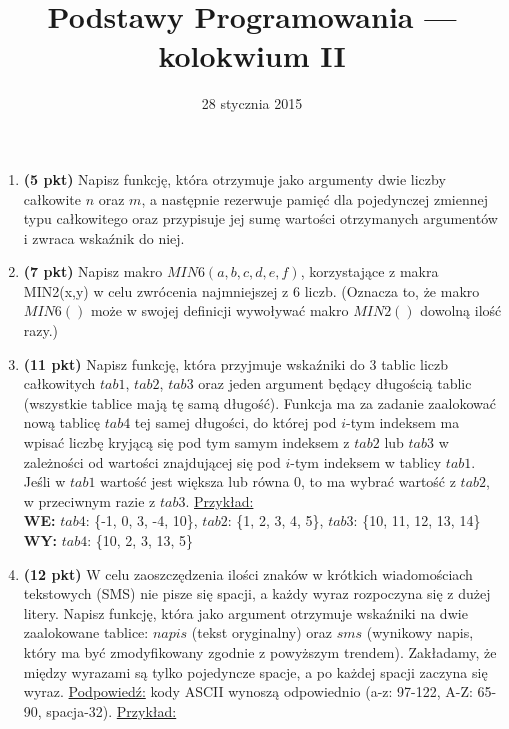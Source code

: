\documentclass[extrafontsizes,10pt]{article}
\title{Podstawy Programowania --- kolokwium II}
\date{28 stycznia 2015}
\begin{document}
\maketitle
\DefineShortVerb{\|}
\thispagestyle{empty}
\begin{enumerate}
\itemsep1em


\item \textbf{(5 pkt)}
Napisz funkcję, która otrzymuje jako argumenty dwie liczby całkowite $n$ oraz $m$,
a następnie rezerwuje pamięć dla pojedynczej zmiennej typu całkowitego
oraz przypisuje jej sumę wartości otrzymanych argumentów i zwraca wskaźnik do niej.


\item \textbf{(7 pkt)}
Napisz makro $MIN6(a,b,c,d,e,f)$, korzystające z makra MIN2(x,y)
w celu zwrócenia najmniejszej z 6 liczb.
(Oznacza to, że makro $MIN6()$ może w swojej
definicji wywoływać makro $MIN2()$ dowolną ilość razy.)


\item \textbf{(11 pkt)}
Napisz funkcję, która przyjmuje wskaźniki do 3 tablic
liczb całkowitych $tab1$, $tab2$, $tab3$
oraz jeden argument będący długością tablic
(wszystkie tablice mają tę samą długość).
Funkcja ma za zadanie zaalokować nową tablicę $tab4$
tej samej długości, do której pod $i$-tym indeksem
ma wpisać liczbę kryjącą się pod tym samym indeksem
z $tab2$ lub $tab3$ w zależności od wartości znajdującej się
pod $i$-tym indeksem w tablicy $tab1$.
Jeśli w $tab1$ wartość jest większa lub równa $0$,
to ma wybrać wartość z $tab2$, w przeciwnym razie
z $tab3$. \underline{Przykład:} \\

\textbf{WE:} $tab4$: \{-1, 0, 3, -4, 10\}, $tab2$: \{1, 2, 3, 4, 5\}, $tab3$: \{10, 11, 12, 13, 14\}\\
\textbf{WY:} $tab4$: \{10, 2, 3, 13, 5\}


\item \textbf{(12 pkt)}
W celu zaoszczędzenia ilości znaków w krótkich
wiadomościach tekstowych (SMS) nie pisze się spacji,
a każdy wyraz rozpoczyna się z dużej litery.
Napisz funkcję, która jako argument otrzymuje wskaźniki
na dwie zaalokowane tablice: $napis$ (tekst oryginalny)
oraz $sms$ (wynikowy napis, który ma być zmodyfikowany
zgodnie z powyższym trendem).
Zakładamy, że między wyrazami są tylko pojedyncze spacje,
a po każdej spacji zaczyna się wyraz.
\underline{Podpowiedź:} kody ASCII wynoszą odpowiednio
(a-z: 97-122, A-Z: 65-90, spacja-32).
\underline{Przykład:} \\


\end{enumerate}
\end{document}
